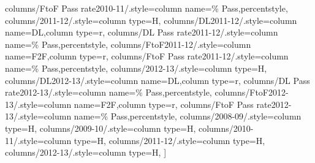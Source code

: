 \documentclass[varwidth]{standalone}
\begin{document}
{    columns/FtoF Pass rate2010-11/.style={column name={\% Pass},percentstyle},
    columns/2011-12/.style={column type=H},
    columns/DL2011-12/.style={column name={DL},column type=r},
    columns/DL Pass rate2011-12/.style={column name={\% Pass},percentstyle},
    columns/FtoF2011-12/.style={column name={F2F},column type=r},
    columns/FtoF Pass rate2011-12/.style={column name={\% Pass},percentstyle},
    columns/2012-13/.style={column type=H},
    columns/DL2012-13/.style={column name={DL},column type=r},
    columns/DL Pass rate2012-13/.style={column name={\% Pass},percentstyle},
    columns/FtoF2012-13/.style={column name={F2F},column type=r},
    columns/FtoF Pass rate2012-13/.style={column name={\% Pass},percentstyle},
    columns/2008-09/.style={column type=H},
    columns/2009-10/.style={column type=H},
    columns/2010-11/.style={column type=H},
    columns/2011-12/.style={column type=H},
    columns/2012-13/.style={column type=H},
]{\dlvsftofdata}
}
\end{document}
